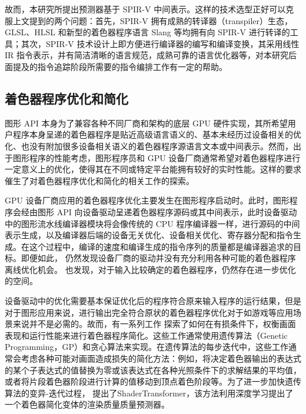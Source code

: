 故而，本研究所提出预测器基于 SPIR-V 中间表示。这样的技术选型正好可以克服上文提到的两个问题：首先，SPIR-V 拥有成熟的转译器（transpiler）生态，GLSL、HLSL 和新型的着色器程序语言 Slang 等均拥有向 SPIR-V 进行转译的工具；其次，SPIR-V 技术设计上即方便进行编译器的编写和编译变换，其采用线性 IR 指令表示，并有简洁清晰的语言规范，成熟可靠的语言优化器等，对本研究后面提及的指令追踪阶段所需要的指令编排工作有一定的帮助。

\subsection{着色器程序优化和简化}

图形 API 本身为了兼容各种不同厂商和架构的底层 GPU 硬件实现，其所希望用户程序本身呈递的着色器程序是贴近高级语言语义的、基本未经历过设备相关的优化、也没有附加很多设备相关语义的着色器程序源语言文本或中间表示。然而，出于图形程序的性能考虑，图形程序员和 GPU 设备厂商通常希望对着色器程序进行一定意义上的优化，使得其在不同或特定平台能拥有较好的实时性能。这样的要求催生了对着色器程序优化和简化的相关工作的探索。

GPU 设备厂商应用的着色器程序优化主要发生在图形程序启动时。此时，图形程序会经由图形 API 向设备驱动呈递着色器程序源码或其中间表示，此时设备驱动中的图形流水线编译器模块将会像传统的 CPU 程序编译器一样，进行源码的中间表示生成，以及编译器后端的设备无关优化、设备相关优化、寄存器分配和指令生成。在这个过程中，编译的速度和编译生成的指令序列的质量都是编译器追求的目标。即便如此，\citet{8366956} 仍然发现设备厂商的驱动并没有充分利用各种可能的着色器程序离线优化机会。\citet{8891638} 也发现，对于输入比较确定的着色器程序，仍然存在进一步优化的空间。

设备驱动中的优化需要基本保证优化后的程序符合原来输入程序的运行结果，但是对于图形应用来说，进行输出完全符合原状的着色器程序优化对于如游戏等应用场景来说并不是必需的。故而，有一系列工作 \cite{10.1145/3528233.3530722, 10.1145/2661229.2661276, 10.1145/2070781.2024186, 10.1145/2816795.2818104, 9815871} 探索了如何在有损条件下，权衡画面表现和运行性能来进行着色器程序简化。这些工作通常使用遗传算法（Genetic Programming，GP）和贪心算法来实现。在遗传算法的每步迭代中，这些工作通常会考虑各种可能对画面造成损失的简化方法：例如，将决定着色器输出的表达式的某个子表达式的值替换为零或该表达式在各种光照条件下的求解结果的平均值，或者将片段着色器阶段进行计算的值移动到顶点着色阶段等。为了进一步加快遗传算法的变异-迭代过程，\citet{10.1145/3528233.3530722} 提出了ShaderTransformer，该方法利用深度学习提出了一个着色器简化变体的渲染质量质量预测器。

